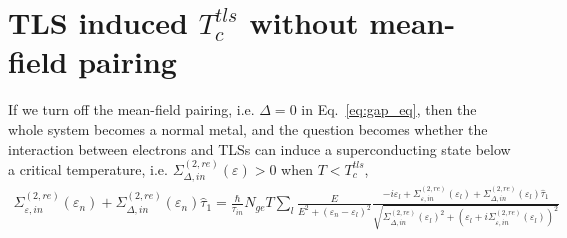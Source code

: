 \documentclass[]{article}
\begin{document}
\section{TLS induced $T_c^{tls}$ without mean-field pairing}
If we turn off the mean-field pairing, i.e. $\Delta = 0$ in Eq.~\eqref{eq:gap_eq}, then the whole system
becomes a normal metal, and the question becomes whether the interaction between electrons and TLSs
can induce a superconducting state below a critical temperature,
i.e. $\Sigma_{\Delta,in}^{(2,re)}(\varepsilon) > 0$ when $T < T_c^{tls}$,
\begin{align}
    \Sigma_{\varepsilon,in}^{(2,re)}(\varepsilon_n) + \Sigma_{\Delta,in}^{(2,re)}(\varepsilon_n)\widehat{\tau}_1
    = \frac{\hbar}{\tau_{in}}N_{ge}T\sum_l\frac{E}{E^2+(\varepsilon_n-\varepsilon_l)^2}
    \frac{-i\varepsilon_l + \Sigma_{\varepsilon,in}^{(2,re)}(\varepsilon_l)
     + \Sigma_{\Delta,in}^{(2,re)}(\varepsilon_l)\widehat{\tau}_1}
     {\sqrt{\Sigma_{\Delta,in}^{(2,re)}(\varepsilon_l)^2 
     + \left(\varepsilon_l+i\Sigma_{\varepsilon,in}^{(2,re)}(\varepsilon_l)\right)^2}}
\end{align}
\end{document}
